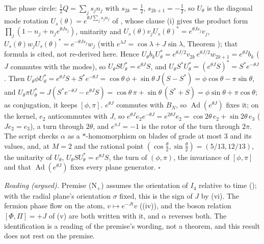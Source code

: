 The phase circle: $\tfrac12Q = \sum_{j}s_{j}n_{j}$ with $s_{2k} = \tfrac12$, $s_{2k+1} = -\tfrac12$, so $U_{\theta}$ is the diagonal mode rotation $U_{s}(\theta) = e^{\theta J\sum_{j}s_{j}n_{j}}$ of , whose clause (i) gives the product form $\prod_{j}(1 - n_{j} + n_{j}e^{\theta Js_{j}})$, unitarity and $U_{s}(\theta)v_{j}U_{s}(\theta)^{*} = e^{\theta Js_{j}}v_{j}$, $U_{s}(\theta)w_{j}U_{s}(\theta)^{*} = e^{-\theta Js_{j}}w_{j}$ (with $e^{\lambda J} = \cos\lambda + J\sin\lambda$, Theorem ); that formula is cited, not re-derived here. Hence $U_{\theta}b_{k}U_{\theta}^{*} = e^{\theta J/2}v_{2k}\,e^{\theta J/2}w_{2k+1} = e^{\theta J}b_{k}$ ($J$ commutes with the modes), so $U_{\theta}SU_{\theta}^{*} = e^{\theta J}S$, and $U_{\theta}S^{*}U_{\theta}^{*} = (e^{\theta J}S)^{*} = S^{*}e^{-\theta J}$. Then $U_{\theta}\phi U_{\theta}^{*} = e^{\theta J}S + S^{*}e^{-\theta J} = \cos\theta\,\phi + \sin\theta\,J(S - S^{*}) = \phi\cos\theta - \pi\sin\theta$, and $U_{\theta}\pi U_{\theta}^{*} = J(S^{*}e^{-\theta J} - e^{\theta J}S) = \cos\theta\,\pi + \sin\theta\,(S^{*} + S) = \phi\sin\theta + \pi\cos\theta$; as conjugation, it keeps $[\phi, \pi]$. $e^{\theta J}$ commutes with $B_{N}$, so $\operatorname{Ad}(e^{\theta J})$ fixes it; on the kernel, $e_{2}$ anticommutes with $J$, so $e^{\theta J}e_{2}e^{-\theta J} = e^{2\theta J}e_{2} = \cos 2\theta\,e_{2} + \sin 2\theta\,e_{3}$ ($Je_{2} = e_{3}$), a turn through $2\theta$, and $e^{\pi J} = -1$ is the rotor of the turn through $2\pi$. The script checks $\alpha$ as a $*$-homomorphism on blades of grade at most $3$ and its values, and, at $M = 2$ and the rational point $(\cos\tfrac{\theta}{2}, \sin\tfrac{\theta}{2}) = (5/13, 12/13)$, the unitarity of $U_{\theta}$, $U_{\theta}SU_{\theta}^{*} = e^{\theta J}S$, the turn of $(\phi, \pi)$, the invariance of $[\phi, \pi]$ and that $\operatorname{Ad}(e^{\theta J})$ fixes every plane generator. $\square$

\emph{Reading (argued).} Premise (N$_{+}$) assumes the orientation of $I_{4}$ relative to time (); with the radial plane's orientation $\sigma$ fixed, this is the sign of $J$ by (vi). The fermion phase flow on the atom, $v \mapsto e^{-Jt}v$ ((iv)), and the boson relation $[\Phi, \Pi] = +J$ of (v) are both written with it, and $\alpha$ reverses both. The identification is a reading of the premise's wording, not a theorem, and this result does not rest on the premise.
